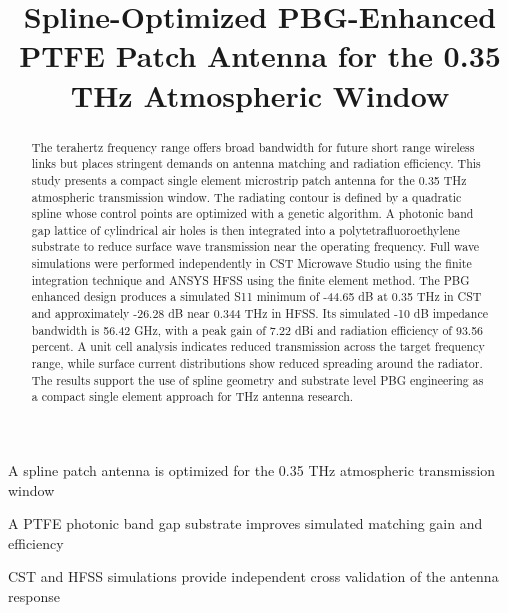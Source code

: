 \documentclass[draft]{agujournal2019}
\begin{document}
\title{Spline-Optimized PBG-Enhanced PTFE Patch Antenna for the 0.35 THz Atmospheric Window}




\begin{keypoints}
\item A spline patch antenna is optimized for the 0.35 THz atmospheric transmission window
\item A PTFE photonic band gap substrate improves simulated matching gain and efficiency
\item CST and HFSS simulations provide independent cross validation of the antenna response
\end{keypoints}

\begin{abstract}
The terahertz frequency range offers broad bandwidth for future short range wireless links but places stringent demands on antenna matching and radiation efficiency. This study presents a compact single element microstrip patch antenna for the 0.35 THz atmospheric transmission window. The radiating contour is defined by a quadratic spline whose control points are optimized with a genetic algorithm. A photonic band gap lattice of cylindrical air holes is then integrated into a polytetrafluoroethylene substrate to reduce surface wave transmission near the operating frequency. Full wave simulations were performed independently in CST Microwave Studio using the finite integration technique and ANSYS HFSS using the finite element method. The PBG enhanced design produces a simulated S11 minimum of -44.65 dB at 0.35 THz in CST and approximately -26.28 dB near 0.344 THz in HFSS. Its simulated -10 dB impedance bandwidth is 56.42 GHz, with a peak gain of 7.22 dBi and radiation efficiency of 93.56 percent. A unit cell analysis indicates reduced transmission across the target frequency range, while surface current distributions show reduced spreading around the radiator. The results support the use of spline geometry and substrate level PBG engineering as a compact single element approach for THz antenna research.
\end{abstract}
\end{document}
